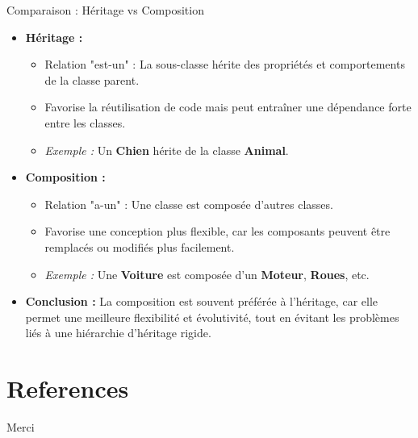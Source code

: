 \documentclass[aspectratio=169]{beamer}
\begin{document}
    \begin{frame}{Comparaison : Héritage vs Composition}
        \begin{itemize}
            \item \textbf{Héritage :}
            \begin{itemize}
                \item Relation "est-un" : La sous-classe hérite des propriétés et comportements de la classe parent.
                \item Favorise la réutilisation de code mais peut entraîner une dépendance forte entre les classes.
                \item \textit{Exemple :} Un \textbf{Chien} hérite de la classe \textbf{Animal}.
            \end{itemize}

            \item \textbf{Composition :}
            \begin{itemize}
                \item Relation "a-un" : Une classe est composée d'autres classes.
                \item Favorise une conception plus flexible, car les composants peuvent être remplacés ou modifiés plus facilement.
                \item \textit{Exemple :} Une \textbf{Voiture} est composée d'un \textbf{Moteur}, \textbf{Roues}, etc.
            \end{itemize}
            
            \item \textbf{Conclusion :} La composition est souvent préférée à l’héritage, car elle permet une meilleure flexibilité et évolutivité, tout en évitant les problèmes liés à une hiérarchie d'héritage rigide.
        \end{itemize}
    \end{frame}

\section{References}
    \begin{frame}[allowframebreaks]
        {
            \tiny
            
            
        }
    \end{frame}


    \begin{frame}
        \begin{center}
            {\Huge\calligra Merci}
        \end{center}
    \end{frame}
\end{document}
